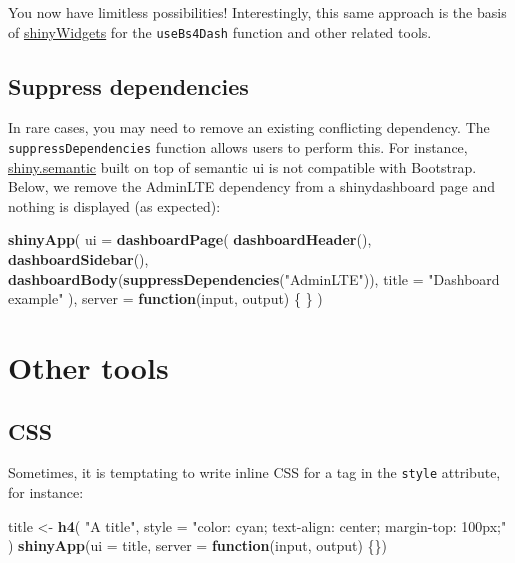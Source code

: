 \documentclass[
]{book}
\newenvironment{Shaded}{\begin{snugshade}}{\end{snugshade}}
\newcommand{\ControlFlowTok}[1]{\textcolor[rgb]{0.13,0.29,0.53}{\textbf{#1}}}
\newcommand{\DataTypeTok}[1]{\textcolor[rgb]{0.13,0.29,0.53}{#1}}
\newcommand{\KeywordTok}[1]{\textcolor[rgb]{0.13,0.29,0.53}{\textbf{#1}}}
\newcommand{\NormalTok}[1]{#1}
\newcommand{\StringTok}[1]{\textcolor[rgb]{0.31,0.60,0.02}{#1}}
\begin{document}
You now have limitless possibilities! Interestingly, this same approach is the basis of \href{https://github.com/dreamRs/shinyWidgets/blob/master/R/useBs4Dash.R}{shinyWidgets} for the \texttt{useBs4Dash} function and other related tools.

\hypertarget{suppress-dependencies}{%
\section{Suppress dependencies}\label{suppress-dependencies}}

In rare cases, you may need to remove an existing conflicting dependency. The \texttt{suppressDependencies} function allows users to perform this. For instance, \href{https://github.com/Appsilon/shiny.semantic}{shiny.semantic} built on top of
semantic ui is not compatible with Bootstrap. Below, we remove the AdminLTE dependency
from a shinydashboard page and nothing is displayed (as expected):

\begin{Shaded}
\begin{Highlighting}[]
\KeywordTok{shinyApp}\NormalTok{(}
  \DataTypeTok{ui =} \KeywordTok{dashboardPage}\NormalTok{(}
    \KeywordTok{dashboardHeader}\NormalTok{(),}
    \KeywordTok{dashboardSidebar}\NormalTok{(),}
    \KeywordTok{dashboardBody}\NormalTok{(}\KeywordTok{suppressDependencies}\NormalTok{(}\StringTok{"AdminLTE"}\NormalTok{)),}
    \DataTypeTok{title =} \StringTok{"Dashboard example"}
\NormalTok{  ),}
  \DataTypeTok{server =} \ControlFlowTok{function}\NormalTok{(input, output) \{ \}}
\NormalTok{)}
\end{Highlighting}
\end{Shaded}

\hypertarget{htmltools-other-tools}{%
\chapter{Other tools}\label{htmltools-other-tools}}

\hypertarget{css}{%
\section{CSS}\label{css}}

Sometimes, it is temptating to write inline CSS for a tag in the \texttt{style} attribute, for instance:

\begin{Shaded}
\begin{Highlighting}[]
\NormalTok{title <-}\StringTok{ }\KeywordTok{h4}\NormalTok{(}
  \StringTok{"A title"}\NormalTok{,}
  \DataTypeTok{style =} \StringTok{"color: cyan; text-align: center; margin-top: 100px;"}
\NormalTok{)}
\KeywordTok{shinyApp}\NormalTok{(}\DataTypeTok{ui =}\NormalTok{ title, }\DataTypeTok{server =} \ControlFlowTok{function}\NormalTok{(input, output) \{\})}
\end{Highlighting}
\end{Shaded}
\end{document}

